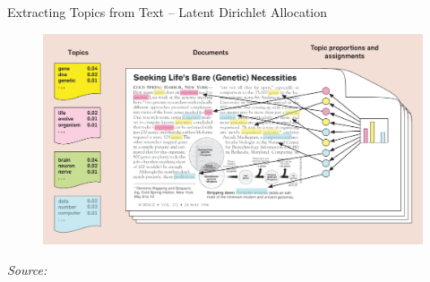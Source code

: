 \documentclass{beamer}
\begin{document}
\begin{frame}{Extracting Topics from Text -- Latent Dirichlet Allocation}
\begin{figure}
	\includegraphics[width=\textwidth]{fig/blei2012probabilistic.png}
\end{figure}
\tiny{\textit{Source:} \cite{blei2012probabilistic}}
\end{frame}
\end{document}
